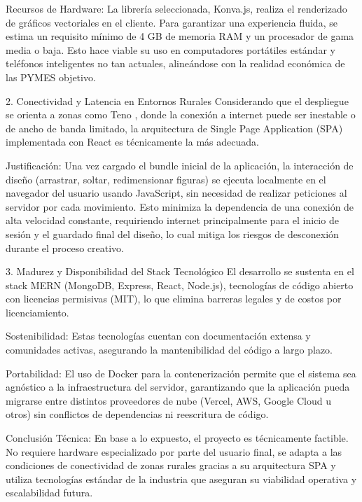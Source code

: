﻿\documentclass{iccmemoria}
\begin{document}
Recursos de Hardware: La librería seleccionada, Konva.js, realiza el renderizado de gráficos vectoriales en el cliente. Para garantizar una experiencia fluida, se estima un requisito mínimo de 4 GB de memoria RAM y un procesador de gama media o baja. Esto hace viable su uso en computadores portátiles estándar y teléfonos inteligentes no tan actuales, alineándose con la realidad económica de las PYMES objetivo.

2. Conectividad y Latencia en Entornos Rurales Considerando que el despliegue se orienta a zonas como Teno , donde la conexión a internet puede ser inestable o de ancho de banda limitado, la arquitectura de Single Page Application (SPA) implementada con React  es técnicamente la más adecuada.


Justificación: Una vez cargado el bundle inicial de la aplicación, la interacción de diseño (arrastrar, soltar, redimensionar figuras) se ejecuta localmente en el navegador del usuario usando JavaScript, sin necesidad de realizar peticiones al servidor por cada movimiento. Esto minimiza la dependencia de una conexión de alta velocidad constante, requiriendo internet principalmente para el inicio de sesión y el guardado final del diseño, lo cual mitiga los riesgos de desconexión durante el proceso creativo.


3. Madurez y Disponibilidad del Stack Tecnológico El desarrollo se sustenta en el stack MERN (MongoDB, Express, React, Node.js), tecnologías de código abierto con licencias permisivas (MIT), lo que elimina barreras legales y de costos por licenciamiento.

Sostenibilidad: Estas tecnologías cuentan con documentación extensa y comunidades activas, asegurando la mantenibilidad del código a largo plazo.


Portabilidad: El uso de Docker  para la contenerización permite que el sistema sea agnóstico a la infraestructura del servidor, garantizando que la aplicación pueda migrarse entre distintos proveedores de nube (Vercel, AWS, Google Cloud u otros) sin conflictos de dependencias ni reescritura de código.

Conclusión Técnica: En base a lo expuesto, el proyecto es técnicamente factible. No requiere hardware especializado por parte del usuario final, se adapta a las condiciones de conectividad de zonas rurales gracias a su arquitectura SPA y utiliza tecnologías estándar de la industria que aseguran su viabilidad operativa y escalabilidad futura.
\end{document}
